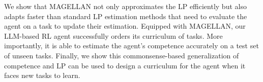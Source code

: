 We show that MAGELLAN not only approximates the LP efficiently but also adapts faster than standard LP estimation methods that need to evaluate the agent on a task to update their estimation. Equipped with MAGELLAN, our LLM-based RL agent successfully orders its curriculum of tasks. More importantly, it is able to estimate the agent's competence accurately on a test set of unseen tasks. Finally, we show this commonsense-based generalization of competence and LP can be used to design a curriculum for the agent when it faces new tasks to learn.

